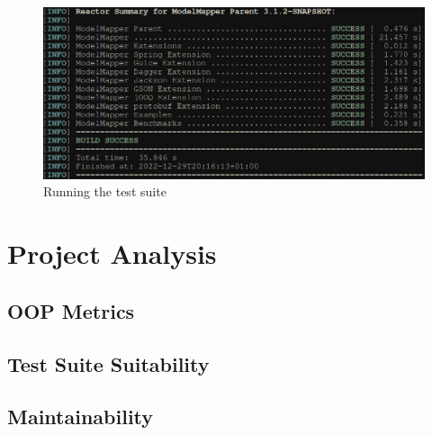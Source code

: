 \documentclass[12pt]{article}
\begin{document}
\begin{figure}[H]
    \centering
    \includegraphics[width=14cm]{images/test-suite.png}
    \caption{Running the test suite}
    \label{intellij-code-coverage}
\end{figure}

\section{Project Analysis}

\subsection{OOP Metrics}

\subsection{Test Suite Suitability}

\subsection{Maintainability}
\end{document}
